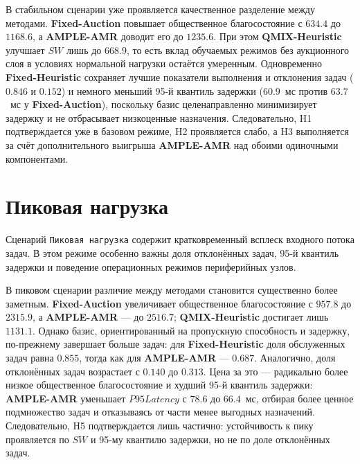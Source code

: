 

В стабильном сценарии уже проявляется качественное разделение между методами. \textbf{Fixed-Auction} повышает общественное благосостояние с $634.4$ до $1168.6$, а \textbf{AMPLE-AMR} доводит его до $1235.6$. При этом \textbf{QMIX-Heuristic} улучшает $SW$ лишь до $668.9$, то есть вклад обучаемых режимов без аукционного слоя в условиях нормальной нагрузки остаётся умеренным. Одновременно \textbf{Fixed-Heuristic} сохраняет лучшие показатели выполнения и отклонения задач ($0.846$ и $0.152$) и немного меньший 95-й квантиль задержки ($60.9$~мс против $63.7$~мс у \textbf{Fixed-Auction}), поскольку базис целенаправленно минимизирует задержку и не отбрасывает низкоценные назначения. Следовательно, H1 подтверждается уже в базовом режиме, H2 проявляется слабо, а H3 выполняется за счёт дополнительного выигрыша \textbf{AMPLE-AMR} над обоими одиночными компонентами.

\section{Пиковая нагрузка}

Сценарий \texttt{Пиковая нагрузка} содержит кратковременный всплеск входного потока задач. В этом режиме особенно важны доля отклонённых задач, 95-й квантиль задержки и поведение операционных режимов периферийных узлов.




В пиковом сценарии различие между методами становится существенно более заметным. \textbf{Fixed-Auction} увеличивает общественное благосостояние с $957.8$ до $2315.9$, а \textbf{AMPLE-AMR} --- до $2516.7$; \textbf{QMIX-Heuristic} достигает лишь $1131.1$. Однако базис, ориентированный на пропускную способность и задержку, по-прежнему завершает больше задач: для \textbf{Fixed-Heuristic} доля обслуженных задач равна $0.855$, тогда как для \textbf{AMPLE-AMR} --- $0.687$. Аналогично, доля отклонённых задач возрастает с $0.140$ до $0.313$. Цена за это --- радикально более низкое общественное благосостояние и худший 95-й квантиль задержки: \textbf{AMPLE-AMR} уменьшает $P95Latency$ с $78.6$ до $66.4$~мс, отбирая более ценное подмножество задач и отказываясь от части менее выгодных назначений. Следовательно, H5 подтверждается лишь частично: устойчивость к пику проявляется по $SW$ и 95-му квантилю задержки, но не по доле отклонённых задач.

